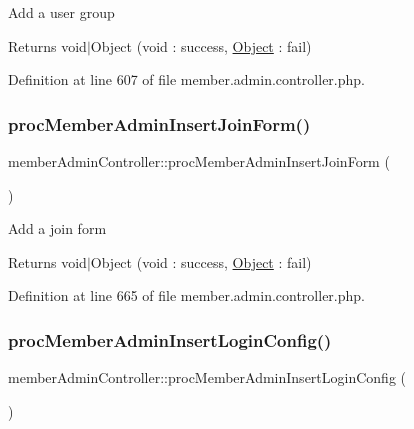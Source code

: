 Add a user group \begin{DoxyReturn}{Returns}
void$\vert$\+Object (void \+: success, \hyperlink{classObject}{Object} \+: fail) 
\end{DoxyReturn}


Definition at line 607 of file member.\+admin.\+controller.\+php.

\mbox{\label{classmemberAdminController_a6b1e886dc7e03b2bd91be9f79c9813ad}} 
\subsubsection{\texorpdfstring{proc\+Member\+Admin\+Insert\+Join\+Form()}{procMemberAdminInsertJoinForm()}}
{\footnotesize\ttfamily member\+Admin\+Controller\+::proc\+Member\+Admin\+Insert\+Join\+Form (\begin{DoxyParamCaption}{ }\end{DoxyParamCaption})}

Add a join form \begin{DoxyReturn}{Returns}
void$\vert$\+Object (void \+: success, \hyperlink{classObject}{Object} \+: fail) 
\end{DoxyReturn}


Definition at line 665 of file member.\+admin.\+controller.\+php.

\mbox{\label{classmemberAdminController_a8145cf05118cd5728eb93066efce3fa8}} 
\subsubsection{\texorpdfstring{proc\+Member\+Admin\+Insert\+Login\+Config()}{procMemberAdminInsertLoginConfig()}}
{\footnotesize\ttfamily member\+Admin\+Controller\+::proc\+Member\+Admin\+Insert\+Login\+Config (\begin{DoxyParamCaption}{ }\end{DoxyParamCaption})}



